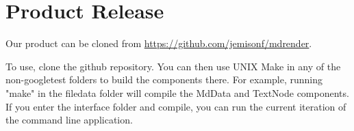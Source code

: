 \section{Product Release}

Our product can be cloned from \url{https://github.com/jemisonf/mdrender}.

To use, clone the github repository. You can then use UNIX Make in any of the non-googletest folders to build the components there. For example, running "make" in the filedata folder will compile the MdData and TextNode components. If you enter the interface folder and compile, you can run the current iteration of the command line application. 
